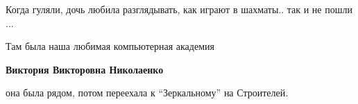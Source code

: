  
 
 
 
 

\qqSecCmt


Когда гуляли, дочь любила разглядывать, как играют в шахматы.. так и не пошли ...


Там была наша любимая компьютерная академия

\textbf{Виктория Викторовна Николаенко} 

она была рядом, потом переехала к \enquote{Зеркальному} на Строителей.

